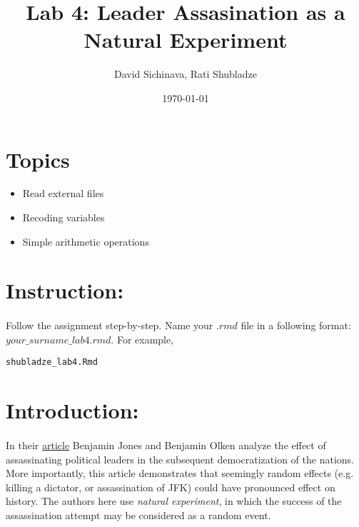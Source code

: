 \documentclass{article}\usepackage[]{graphicx}\usepackage[]{color}
\title{Lab 4: Leader Assasination as a Natural Experiment}
\author{David Sichinava, Rati Shubladze}
\date{\today}
\makeatletter
\newcommand{\hlstd}[1]{\textcolor[rgb]{0.345,0.345,0.345}{#1}}%
\newenvironment{kframe}{%
 \def\at@end@of@kframe{}%
 \ifinner\ifhmode%
  \def\at@end@of@kframe{\end{minipage}}%
  \begin{minipage}{\columnwidth}%
 \fi\fi%
 \def\FrameCommand##1{\hskip\@totalleftmargin \hskip-\fboxsep
 \colorbox{shadecolor}{##1}\hskip-\fboxsep
     \hskip-\linewidth \hskip-\@totalleftmargin \hskip\columnwidth}%
 \MakeFramed {\advance\hsize-\width
   \@totalleftmargin\z@ \linewidth\hsize
   \@setminipage}}%
 {\par\unskip\endMakeFramed%
 \at@end@of@kframe}
\newenvironment{knitrout}{}{} %
\makeatother
\begin{document}
\maketitle
\section*{Topics}
\begin{itemize}
\item Read external files
\item Recoding variables
\item Simple arithmetic operations
\end{itemize}

\section*{Instruction:}

\paragraph{}
Follow the assignment step-by-step. Name your $.rmd$ file in a following format: $your\_surname\_lab4.rmd$. For example,

\begin{knitrout}
\color{fgcolor}\begin{kframe}
\begin{alltt}
\hlstd{shubladze_lab4.Rmd}
\end{alltt}
\end{kframe}
\end{knitrout}

\section*{Introduction:}
\paragraph{}
In their \href{https://www.dropbox.com/s/vcrob2ameksvy7t/Jones%26Olken_2009.pdf?dl=0}{article} Benjamin Jones and Benjamin Olken analyze the effect of assassinating political leaders in the subsequent democratization of the nations. More importantly, this article demonstrates that seemingly random effects (e.g. killing a dictator, or assassination of JFK) could have pronounced effect on history. The authors here use \emph{natural experiment}, in which the success of the assassination attempt may be considered as a random event. 
\end{document}
